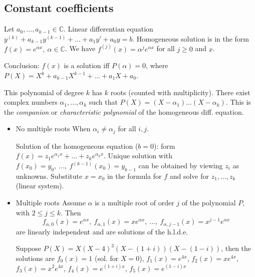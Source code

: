\documentclass[8pt,a4paper,twocolumn,table]{extarticle}
\newcommand{\C}{\mathbb{C}}
\begin{document}
\subsection{Constant coefficients}
\begin{definition}
    Let $a_0, ..., a_{k-1} \in \C$. Linear differentian equation $y^{(k)} + a_{k-1}y^{(k-1)} + ... + a_1y' + a_0y = b$.
    Homogeneous solution is in the form $f(x) = e^{\alpha x},\ \alpha \in \C$. We have $f^{(j)}(x) = \alpha^j e^{\alpha x}$ for all $j \ge 0$ and $x$.

    Conclusion: $f(x)$ is a solution iff $P(\alpha) = 0$, where $P(X) = X^k + a_{k-1}X^{k-1} + ... + a_1X + a_0$.

    This polynomial of degree $k$ has $k$ roots (counted with multiplicity). There exist complex numbers $\alpha_1, ..., \alpha_k$
    such that $P(X) = (X - \alpha_1)...(X - \alpha_k)$. This is the \textit{companion} or \textit{characteristic polynomial} of the
    homogeneous diff. equation.
\end{definition}

\begin{itemize}
    \item No multiple roots
          When $\alpha_i \ne \alpha_j$ for all $i, j$.

          Solution of the homogeneous equation ($b = 0$): form $f(x) = z_1 e^{\alpha_1 x} + ... + z_k e^{\alpha_k x}$.
          Unique solution with $f(x_0) = y_0,\ ...,\ f^{(k-1)}(x_0) = y_{k-1}$ can be obtained by viewing $z_i$ as unknowns. Substitute $x = x_0$ in
          the formula for $f$ and solve for $z_1, ..., z_k$ (linear system).

    \item Multiple roots
          Assume $\alpha$ is a multiple root of order $j$ of the polynomial $P$, with $2 \le j \le k$. Then
          \[ f_{\alpha,0}(x) = e^{\alpha x},\ f_{\alpha,1}(x) = x e^{\alpha x},\ ...,\ f_{\alpha,j-1}(x) = x^{j-1} e^{\alpha x} \]
          are linearly independent and are solutions of the h.l.d.e.

          \begin{example}
              Suppose $P(X) = X(X - 4)^3(X - (1+i))(X - (1 - i))$, then the solutions are
              $f_0(x) = 1$ (sol. for $X=0$), $f_1(x) = e^{4x}$, $f_2(x) = xe^{4x}$, $f_3(x) = x^2 e^{4x}$,
              $f_4(x) = e^{(1+i) x}$, $f_5(x) = e^{(1-i) x}$
          \end{example}

\end{itemize}
\end{document}
